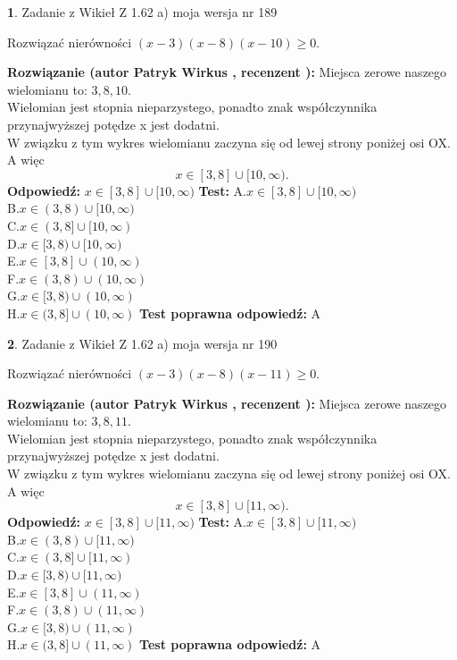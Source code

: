 \documentclass[12pt, a4paper]{article}
\theoremstyle{definition} %
\newtheorem{zad}{}
\newcommand{\zadStart}[1]{\begin{zad}#1\newline}
\newcommand{\zadStop}{\end{zad}}
\newcommand{\rozwStart}[2]{\noindent \textbf{Rozwiązanie (autor #1 , recenzent #2): }\newline}
\newcommand{\rozwStop}{\newline}
\newcommand{\odpStart}{\noindent \textbf{Odpowiedź:}\newline}
\newcommand{\odpStop}{\newline}
\newcommand{\testStart}{\noindent \textbf{Test:}\newline}
\newcommand{\testStop}{\newline}
\newcommand{\kluczStart}{\noindent \textbf{Test poprawna odpowiedź:}\newline}
\newcommand{\kluczStop}{\newline}
\begin{document}
\zadStart{Zadanie z Wikieł Z 1.62 a) moja wersja nr 189}

Rozwiązać nierówności $(x-3)(x-8)(x-10)\ge0$.
\zadStop
\rozwStart{Patryk Wirkus}{}
Miejsca zerowe naszego wielomianu to: $3, 8, 10$.\\
Wielomian jest stopnia nieparzystego, ponadto znak współczynnika przy\linebreak najwyższej potędze x jest dodatni.\\ W związku z tym wykres wielomianu zaczyna się od lewej strony poniżej osi OX. A więc $$x \in [3,8] \cup [10,\infty).$$
\rozwStop
\odpStart
$x \in [3,8] \cup [10,\infty)$
\odpStop
\testStart
A.$x \in [3,8] \cup [10,\infty)$\\
B.$x \in (3,8) \cup [10,\infty)$\\
C.$x \in (3,8] \cup [10,\infty)$\\
D.$x \in [3,8) \cup [10,\infty)$\\
E.$x \in [3,8] \cup (10,\infty)$\\
F.$x \in (3,8) \cup (10,\infty)$\\
G.$x \in [3,8) \cup (10,\infty)$\\
H.$x \in (3,8] \cup (10,\infty)$
\testStop
\kluczStart
A
\kluczStop



\zadStart{Zadanie z Wikieł Z 1.62 a) moja wersja nr 190}

Rozwiązać nierówności $(x-3)(x-8)(x-11)\ge0$.
\zadStop
\rozwStart{Patryk Wirkus}{}
Miejsca zerowe naszego wielomianu to: $3, 8, 11$.\\
Wielomian jest stopnia nieparzystego, ponadto znak współczynnika przy\linebreak najwyższej potędze x jest dodatni.\\ W związku z tym wykres wielomianu zaczyna się od lewej strony poniżej osi OX. A więc $$x \in [3,8] \cup [11,\infty).$$
\rozwStop
\odpStart
$x \in [3,8] \cup [11,\infty)$
\odpStop
\testStart
A.$x \in [3,8] \cup [11,\infty)$\\
B.$x \in (3,8) \cup [11,\infty)$\\
C.$x \in (3,8] \cup [11,\infty)$\\
D.$x \in [3,8) \cup [11,\infty)$\\
E.$x \in [3,8] \cup (11,\infty)$\\
F.$x \in (3,8) \cup (11,\infty)$\\
G.$x \in [3,8) \cup (11,\infty)$\\
H.$x \in (3,8] \cup (11,\infty)$
\testStop
\kluczStart
A
\kluczStop
\end{document}
